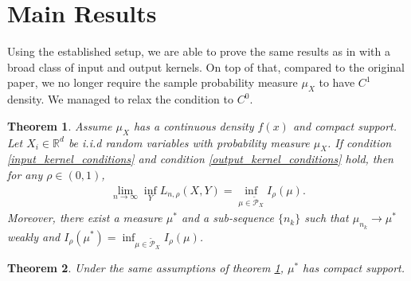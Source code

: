 \documentclass[10pt]{article}
\newtheorem{theorem}{\bf Theorem}
\newenvironment{Proof of lemma}{\noindent{\bf Proof of Lemma}}{\hfill$\Box$\newline}
\newenvironment{Proof of claim}{\noindent{\bf Proof of claim}}{\hfill$\Box$\newline}
\newenvironment{Proof of theorem}{\noindent{\bf Proof of Theorem}}{\hfill\scriptsize{$\Box$}\newline}
\newenvironment{Proof of theorems}{\noindent{\bf Proof of Theorems}}{\hfill$\Box$\newline}
\newenvironment{Proof of proposition}{\noindent{\bf Proof of Proposition}}{\hfill$\Box$\newline}
\newenvironment{Proof of propositions}{\noindent{\bf Proof of Propositions}}{\hfill$\Box$\newline}
\newenvironment{Proof of exercise}{\noindent{\it Proof of Exercise:}}{\hfill$\Box$}
\numberwithin{equation}{section}
\begin{document}
\section{Main Results} \label{tsne:sec:main_results}
Using the established setup, we are able to prove the same results as in
\cite{auffinger-tsne} with a broad class of input and output kernels. On top of
that, compared to the original paper, we no longer require the sample
probability measure $\mu_X$ to have $C^1$ density. We managed to relax the
condition to $C^0$.
\begin{theorem} \label{tsne:main_theorem_1}
    Assume $\mu_X$ has a continuous density $f(x)$ and compact support. Let $X_i \in \mathbb{R}^d$ be i.i.d random variables with probability measure $\mu_X$. If condition \ref{input_kernel_conditions} and condition \ref{output_kernel_conditions} hold, then for any $\rho \in (0,1)$,
    \begin{align}
        \lim_{n \to \infty} \inf_Y L_{n,\rho}(X,Y) = \inf_{\mu \in \tilde{\mathcal{P}}_X} I_{\rho}(\mu).
    \end{align}
    Moreover, there exist a measure $\mu^*$ and a sub-sequence $\{n_k\}$ such that $\mu_{n_k} \to \mu^*$ weakly and $I_{\rho}(\mu^*) = \inf_{\mu \in \tilde{\mathcal{P}}_X} I_{\rho}(\mu)$.
\end{theorem}
\begin{theorem} \label{tsne:main_theorem_2}
    Under the same assumptions of theorem \ref{tsne:main_theorem_1}, $\mu^*$ has compact support.
\end{theorem}
\end{document}
